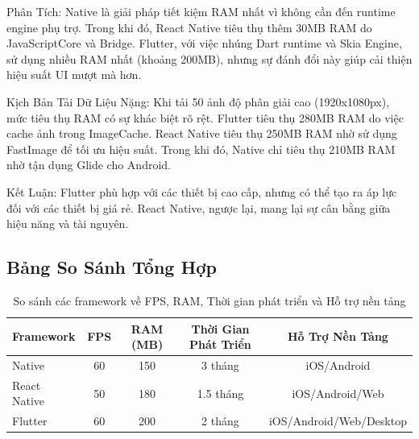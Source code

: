   \begin{flushleft}
    \hspace*{0.8cm}Phân Tích:
    Native là giải pháp tiết kiệm RAM nhất vì không cần đến runtime engine phụ trợ. Trong khi đó, React Native tiêu thụ thêm 30MB RAM do JavaScriptCore và Bridge. Flutter, với việc nhúng Dart runtime và Skia Engine, sử dụng nhiều RAM nhất (khoảng 200MB), nhưng sự đánh đổi này giúp cải thiện hiệu suất UI mượt mà hơn.
  \end{flushleft}
  \begin{flushleft}
    \hspace*{0.8cm}Kịch Bản Tải Dữ Liệu Nặng: Khi tải 50 ảnh độ phân giải cao (1920x1080px), mức tiêu thụ RAM có sự khác biệt rõ rệt. Flutter tiêu thụ 280MB RAM do việc cache ảnh trong ImageCache. React Native tiêu thụ 250MB RAM nhờ sử dụng FastImage để tối ưu hiệu suất. Trong khi đó, Native chỉ tiêu thụ 210MB RAM nhờ tận dụng Glide cho Android.
  \end{flushleft}

  \begin{flushleft}
      \hspace*{0.8cm}Kết Luận: Flutter phù hợp với các thiết bị cao cấp, nhưng có thể tạo ra áp lực đối với các thiết bị giá rẻ. React Native, ngược lại, mang lại sự cân bằng giữa hiệu năng và tài nguyên.
  \end{flushleft}

\subsection{Bảng So Sánh Tổng Hợp}
\renewcommand{\labelitemi}{--}    
\begin{table}[H]
  \centering
  \begin{tabular}{|l|c|c|c|c|}
  \hline
  \textbf{Framework} & \textbf{FPS} & \textbf{RAM (MB)} & \textbf{Thời Gian Phát Triển} & \textbf{Hỗ Trợ Nền Tảng} \\
  \hline
  Native       & 60          & 150               & 3 tháng                      & iOS/Android \\
  React Native & 50          & 180               & 1.5 tháng                    & iOS/Android/Web \\
  Flutter      & 60          & 200               & 2 tháng                      & iOS/Android/Web/Desktop \\
  \hline
  \end{tabular}
  \caption{So sánh các framework về FPS, RAM, Thời gian phát triển và Hỗ trợ nền tảng}
  \end{table}
  

